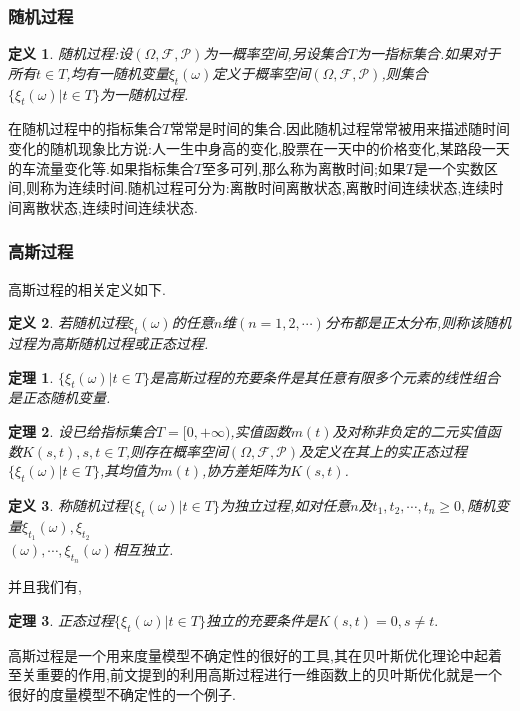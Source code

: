 \documentclass{ctexart}
\newtheorem{Def}{\hspace{2em}定义}
\newtheorem{Theo}{\hspace{2em}定理}
\begin{document}
\subsubsection{随机过程}
\begin{Def}
随机过程:设$(\Omega,\mathcal{F,P})$为一概率空间,另设集合$T$为一指标集合.如果对于所有$t\in T$,均有一随机变量$\xi_t(\omega)$定义于概率空间$(\Omega,\mathcal{F,P})$,则集合$\{\xi_t(\omega)|t\in T\}$为一随机过程.
\end{Def}

在随机过程中的指标集合$T$常常是时间的集合.因此随机过程常常被用来描述随时间变化的随机现象比方说:人一生中身高的变化,股票在一天中的价格变化,某路段一天的车流量变化等.如果指标集合$T$至多可列,那么称为离散时间;如果$T$是一个实数区间,则称为连续时间.随机过程可分为:离散时间离散状态,离散时间连续状态,连续时间离散状态,连续时间连续状态.


\subsubsection{高斯过程}
高斯过程的相关定义如下.
\begin{Def}
若随机过程$\xi_t(\omega)$的任意$n$维$(n=1,2,\cdots)$分布都是正太分布,则称该随机过程为高斯随机过程或正态过程.
\end{Def}
\begin{Theo}
	$\{\xi_t(\omega)|t\in T\}$是高斯过程的充要条件是其任意有限多个元素的线性组合是正态随机变量.
\end{Theo}
\begin{Theo}
设已给指标集合$T=[0,+\infty)$,实值函数$m(t)$及对称非负定的二元实值函数$K(s,t),s,t\in T$,则存在概率空间$(\Omega,\mathcal{F,P})$及定义在其上的实正态过程$\{\xi_t(\omega)|t\in T\}$,其均值为$m(t)$,协方差矩阵为$K(s,t)$.
\end{Theo}
\begin{Def}
	称随机过程$\{\xi_t(\omega)|t\in T\}$为独立过程,如对任意$n$及$t_1,t_2,\cdots,t_n\ge 0,$随机变量$\xi_{t_1}(\omega),\xi_{t_2}$\\$(\omega),\cdots,\xi_{t_n}(\omega)$相互独立.
\end{Def}
并且我们有,
\begin{Theo}
	正态过程$\{\xi_t(\omega)|t\in T\}$独立的充要条件是$K(s,t)=0,s\ne t.$
\end{Theo}


高斯过程是一个用来度量模型不确定性的很好的工具,其在贝叶斯优化理论中起着至关重要的作用,前文提到的利用高斯过程进行一维函数上的贝叶斯优化就是一个很好的度量模型不确定性的一个例子.
\end{document}
